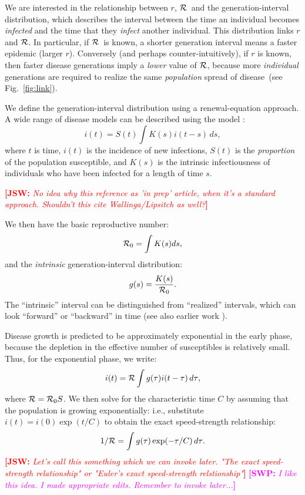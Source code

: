 \documentclass[12pt]{article}
\newcommand{\RR}{\ensuremath{{\cal R}}}
\newcommand{\Rx}[1]{\ensuremath{{\cal R}_{#1}}}
\newcommand{\Ro}{\Rx{0}}
\newcommand{\Tc}{\ensuremath{C}}
\newcommand{\fref}[1]{Fig.~\ref{fig:#1}}
\newcommand{\comment}[3]{\textcolor{#1}{\textbf{[#2: }\textit{#3}\textbf{]}}}
\newcommand{\swp}[1]{\comment{magenta}{SWP}{#1}}
\newcommand{\jsw}[1]{\comment{red}{JSW}{#1}}
\begin{document}
We are interested in the relationship between $r$, \RR~and the generation-interval distribution, which describes the interval between the time an individual becomes \emph{infected} and the time that they \emph{infect} another individual.
This distribution links $r$ and \RR. In particular, if \RR~is known, a shorter generation interval means a faster epidemic (larger $r$). Conversely (and perhaps counter-intuitively), if $r$ is known, then faster disease generations imply a \emph{lower} value of \RR, because more \emph{individual} generations are required to realize the same \emph{population} spread of disease~(see \fref{link}).

We define the generation-interval distribution using a renewal-equation approach.
A wide range of disease models can be described using the model 
\cite{heesterbeek1996concept,ChampInPrep}:
\begin{equation}
i(t) = S(t)\int{K(s)i(t-s) \,ds},
\label{eq:Renewal}
\end{equation}
where $t$ is time, $i(t)$ is the incidence of new infections, $S(t)$ is the \emph{proportion} of the population susceptible, and $K(s)$ is the intrinsic infectiousness of individuals who have been infected for a length of time $s$.

\jsw{No idea why this reference as 'in prep' article, when it's a standard approach. Shouldn't this cite Wallinga/Lipsitch as well?}

We then have the basic reproductive number: 
\begin{equation}
\Ro = \int{K(s)ds},
\end{equation}
and the \emph{intrinsic} generation-interval distribution:
\begin{equation}
g(s) = \frac{K(s)}{\Ro}.
\end{equation}
The ``intrinsic'' interval can be distinguished from ``realized'' intervals, which can look ``forward'' or ``backward'' in time \cite{ChamDush15} (see also earlier work \cite{Sven07,Nish10}).

Disease growth is predicted to be approximately exponential in the early phase, because the depletion in the effective number of susceptibles is relatively small.
Thus, for the exponential phase, we write:
\begin{equation}
i(t) = \RR\int{g(\tau)i(t-\tau) \,d\tau},
\end{equation}
where $\RR = \Ro S$.
We then solve for the characteristic time $\Tc$ by assuming that the population is growing exponentially: i.e., substitute $i(t) = i(0) \exp(t/\Tc)$ to obtain the exact speed-strength relationship:
\begin{equation}
	1/\RR = \int{g(\tau)\exp(-\tau/\Tc) \,d\tau}.\label{eq:Euler}
\end{equation}
\jsw{Let's call this something which we can invoke later. "The exact speed-strength relationship" or "Euler's exact speed-strength relstionship"}
\swp{I like this idea. I made appropriate edits. Remember to invoke later...}
\end{document}
